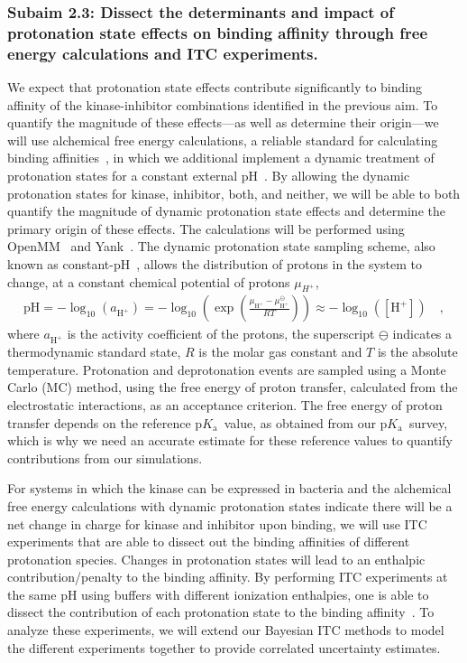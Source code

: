 \documentclass[10pt,final]{article}
\newcommand{\pKa}{p$K_\mathrm{a}$\ }
\newcommand{\pH}{p$\mathrm{H}$\ }
\begin{document}
\subsubsection*{Subaim 2.3: Dissect the determinants and impact of protonation state effects on binding affinity through free energy calculations and ITC experiments.}
We expect that protonation state effects contribute significantly to binding affinity of the kinase-inhibitor combinations identified in the previous aim.
%
To quantify the magnitude of these effects---as well as determine their origin---we will use alchemical free energy calculations, a reliable standard for calculating binding affinities~\autocite{Fujitani2005a,Deng2006a,Wang2015a}, in which we additional implement a dynamic treatment of protonation states for a constant external pH~\autocite{Mongan2004a,Stern2007a,Nilmeier2011a}.
%
By allowing the dynamic protonation states for kinase, inhibitor, both, and neither, we will be able to both quantify the magnitude of dynamic protonation state effects and determine the primary origin of these effects.
%
The calculations will be performed using OpenMM~\autocite{Eastman2013a} and Yank~\autocite{Chodera2015a}.
%
The dynamic protonation state sampling scheme, also known as constant-\pH, allows the distribution of protons in the system to change, at a constant chemical potential of protons $\mu_{H^+}$,
\begin{align}
 \text{p}\mathrm{H} = -\log_{10}\left( a_{\mathrm{H}^+} \right) = -\log_{10}\left( \exp\left(\frac{\mu_{\mathrm{H}^+} -\mu_{\mathrm{H}^+}^\ominus}{RT}\right)\right) \approx -\log_{10}\left( [\mathrm{H}^+] \right) \quad,
\end{align}
%
where $a_{\mathrm{H}^+}$ is the activity coefficient of the protons, the superscript $\ominus$ indicates a thermodynamic standard state, $R$ is the molar gas constant and $T$ is the absolute temperature.
%
Protonation and deprotonation events are sampled using a Monte Carlo (MC) method, using the free energy of proton transfer, calculated from the electrostatic interactions, as an acceptance criterion.
%
The free energy of proton transfer depends on the reference \pKa value, as obtained from our \pKa survey, which is why we need an accurate estimate for these reference values to quantify contributions from our simulations.
%

For systems in which the kinase can be expressed in bacteria and the alchemical free energy calculations with dynamic protonation states indicate there will be a net change in charge for kinase and inhibitor upon binding, we will use ITC experiments that are able to dissect out the binding affinities of different protonation species.
%
Changes in protonation states will lead to an enthalpic contribution/penalty to the binding affinity.
%
By performing ITC experiments at the same pH using buffers with different ionization enthalpies, one is able to dissect the contribution of each protonation state to the binding affinity~\autocite{Baker1996a,Neeb2014a}.
%
To analyze these experiments, we will extend our Bayesian ITC methods to model the different experiments together to provide correlated uncertainty estimates.
\end{document}

